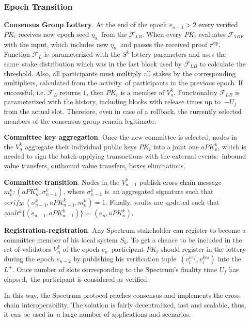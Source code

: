 \subsubsection{Epoch Transition}\label{subsubsec:epoch-transition}
\begin{legal}
    \item \textbf{Consensus Group Lottery}.
    At the end of the epoch ${e_{n-1} \gt 2}$ every verified $PK_i$ receives new epoch seed $\eta_n$\
    from the ${\mathcal{F}}_{LB}$.
    When every $PK_i$ evaluates ${\mathcal{F}}_{VRF}$ with the input, which includes new $\eta_n$\
    and passes the received proof $\pi^{\text{ep}}$.
    Function ${\mathcal{F}}_{L}$ is parameterized with the $S^k$ lottery parameters and uses the same\
    stake distribution which was in the last block used by ${\mathcal{F}}_{LB}$ to calculate the threshold.
    Also, all participants must multiply all stakes by the corresponding multipliers, calculated from the activity\
    of participants in the previous epoch.
    If successful, i.e. ${\mathcal{F}}_{L}$ returns $1$, then $PK_i$ is a member of $V^k_n$.
    Functionality ${\mathcal{F}}_{LB}$ is parameterized with the history, including blocks with release times up to\
    ${-U_f}$ from the actual slot.
    Therefore, even in case of a rollback, the currently selected members of the consensus group remain legitimate.

    \item \textbf{Committee key aggregation}.
    Once the new committee is selected, nodes in the $V^k_n$ aggregate their individual public keys $PK_i$ into
    a joint one $aPK^k_n$, which is needed to sign the batch applying transactions with the external events:\
    inbound value transfers, outbound value transfers, boxes eliminations.

    \item \textbf{Committee transition}.
    Nodes in the $V^k_{n - 1}$ publish cross-chain message ${m^k_n : (aPK^k_n, \sigma^k_{n-1})}$, where $\sigma^k_{n-1}$ is\
    an aggregated signature such that ${verify: (\sigma^k_{n-1}, aPK^k_{n-1}, m^k_n) = 1}$.
    Finally, vaults are updated such that ${vault^k\{(e_{n-1}, aPK^k_{n-1})\} \coloneqq(e_n, aPK^k_n)}$.
\end{legal}

\textbf{Registration\/\De-registration}.
Any Spectrum stakeholder can register to become a committee member of his local system $S_k$.
To get a chance to be included in the set of validators $V^k_n$ of the epoch $e_n$\
participant $PK_i$ should register in the lottery during the epoch $e_{n-2}$ by publishing his verification tuple\
${(v_i^{vrf}, v_i^{kes})}$ into the $L^+$.
Once number of slots corresponding to the Spectrum's finality time $U_f$ has elapsed,\
the participant is considered as verified.

In this way, the Spectrum protocol reaches consensus and implements the cross-chain interoperability.
The solution is fairly decentralized, fast and scalable, thus, it can be used in\
a large number of applications and scenarios.